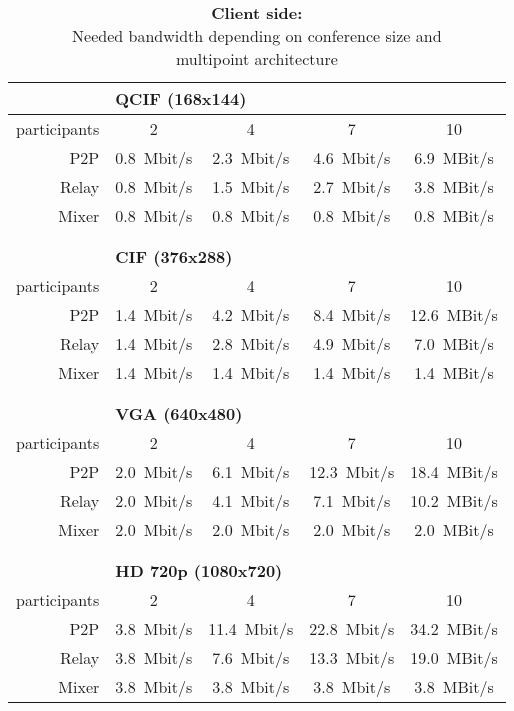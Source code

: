 \begin{table}[htbp]
\centering
\caption[Bandwidth requirements on client side of conversation]{\textbf{Client side:} \\Needed bandwidth depending on conference size and \\multipoint architecture}
\begin{tabular}{r c c c c}

    \toprule
    & \multicolumn{4}{l}{\textbf{QCIF (168x144)} }\\
    \toprule
    participants & 2 & 4 & 7 & 10\\
    \midrule
    P2P & 0.8~Mbit/s & 2.3~Mbit/s & 4.6~Mbit/s & 6.9~MBit/s\\
    Relay & 0.8~Mbit/s & 1.5~Mbit/s & 2.7~Mbit/s  & 3.8~MBit/s\\
    Mixer & 0.8~Mbit/s & 0.8~Mbit/s & 0.8~Mbit/s  & 0.8~MBit/s\\
    \bottomrule
    
    &&&&\\ &&&&\\
    
    \toprule
    & \multicolumn{4}{l}{\textbf{CIF (376x288)} }\\
    \toprule
    participants & 2 & 4 & 7 & 10\\
    \midrule
    P2P & 1.4~Mbit/s & 4.2~Mbit/s & 8.4~Mbit/s & 12.6~MBit/s\\
    Relay & 1.4~Mbit/s & 2.8~Mbit/s & 4.9~Mbit/s  & 7.0~MBit/s\\
    Mixer & 1.4~Mbit/s & 1.4~Mbit/s & 1.4~Mbit/s  & 1.4~MBit/s\\
    \bottomrule
    
    &&&&\\ &&&&\\
    
    \toprule
    & \multicolumn{4}{l}{\textbf{VGA (640x480)} }\\
    \toprule
    participants & 2 & 4 & 7 & 10\\
    \midrule
    P2P & 2.0~Mbit/s & 6.1~Mbit/s & 12.3~Mbit/s & 18.4~MBit/s\\
    Relay & 2.0~Mbit/s & 4.1~Mbit/s & 7.1~Mbit/s  & 10.2~MBit/s\\
    Mixer & 2.0~Mbit/s & 2.0~Mbit/s & 2.0~Mbit/s  & 2.0~MBit/s\\
    \bottomrule

    &&&&\\ &&&&\\
        
    \toprule
    & \multicolumn{4}{l}{\textbf{HD 720p (1080x720)} }\\
    \toprule
    participants & 2 & 4 & 7 & 10\\
    \midrule
    P2P & 3.8~Mbit/s & 11.4~Mbit/s & 22.8~Mbit/s & 34.2~MBit/s\\
    Relay & 3.8~Mbit/s & 7.6~Mbit/s & 13.3~Mbit/s  & 19.0~MBit/s\\
    Mixer & 3.8~Mbit/s & 3.8~Mbit/s & 3.8~Mbit/s  & 3.8~MBit/s\\
    \bottomrule
    

    \end{tabular}%
  \label{tab:benchmark-client}%
\end{table}%
